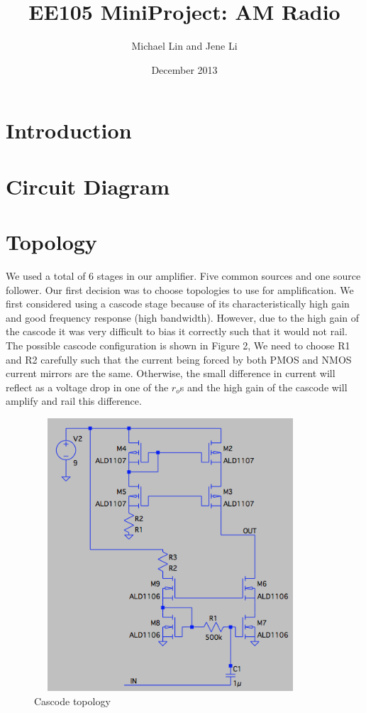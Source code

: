 \documentclass[11pt, twoside, letterpaper]{article}
\title{EE105 MiniProject: AM Radio}
\author{Michael Lin and Jene Li}
\date{December 2013}
\begin{document}
\maketitle

\section{Introduction}

\section{Circuit Diagram}

\section{Topology}
We used a total of 6 stages in our amplifier. Five common sources and one source follower.
Our first decision was to choose topologies to use for amplification. We first considered using a cascode stage because of 
its characteristically high gain and good frequency response (high bandwidth). However, due to the high gain of the cascode
it was very difficult to bias it correctly such that it would not rail. The possible cascode configuration is shown in Figure 2,
We need to choose R1 and R2 carefully such that the current being forced by both PMOS and NMOS current mirrors are the same.
Otherwise, the small difference in current will reflect as a voltage drop in one of the $r_o$s and the high gain of the cascode
will amplify and rail this difference.
\begin{figure}[htbp]
\begin{center}
\includegraphics[width=4in,height=4in]{Cascode.png}
\caption{Cascode topology}
\end{center}
\end{figure}
\end{document}
